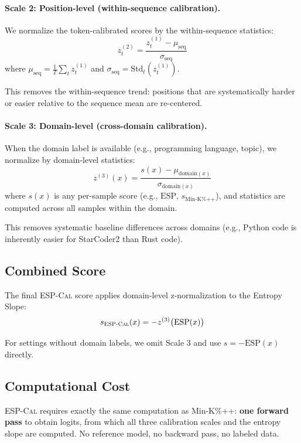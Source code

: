 \documentclass[11pt]{article}
\newcommand{\ours}{\textsc{ESP-Cal}}
\newcommand{\esp}{\text{ESP}}
\newcommand{\minkpp}{\text{Min-K\%++}}
\begin{document}
\paragraph{Scale 2: Position-level (within-sequence calibration).}
We normalize the token-calibrated scores by the within-sequence statistics:
\begin{equation}
    z^{(2)}_t = \frac{z^{(1)}_t - \mu_{\text{seq}}}{\sigma_{\text{seq}}}
\end{equation}
where $\mu_{\text{seq}} = \frac{1}{T}\sum_t z^{(1)}_t$ and $\sigma_{\text{seq}} = \text{Std}_t(z^{(1)}_t)$.

This removes the within-sequence trend: positions that are systematically harder or easier relative to the sequence mean are re-centered.

\paragraph{Scale 3: Domain-level (cross-domain calibration).}
When the domain label is available (e.g., programming language, topic), we normalize by domain-level statistics:
\begin{equation}
    z^{(3)}(x) = \frac{s(x) - \mu_{\text{domain}(x)}}{\sigma_{\text{domain}(x)}}
\end{equation}
where $s(x)$ is any per-sample score (e.g., $\esp$, $s_{\minkpp{}}$), and statistics are computed across all samples within the domain.

This removes systematic baseline differences across domains (e.g., Python code is inherently easier for StarCoder2 than Rust code).

\subsection{Combined Score}
\label{sec:combined}

The final \ours{} score applies domain-level z-normalization to the Entropy Slope:
\begin{equation}
    s_{\ours{}}(x) = -z^{(3)}\big(\esp(x)\big)
\end{equation}

For settings without domain labels, we omit Scale 3 and use $s = -\esp(x)$ directly.

\subsection{Computational Cost}

\ours{} requires exactly the same computation as Min-K\%++: \textbf{one forward pass} to obtain logits, from which all three calibration scales and the entropy slope are computed.
No reference model, no backward pass, no labeled data.
\end{document}
